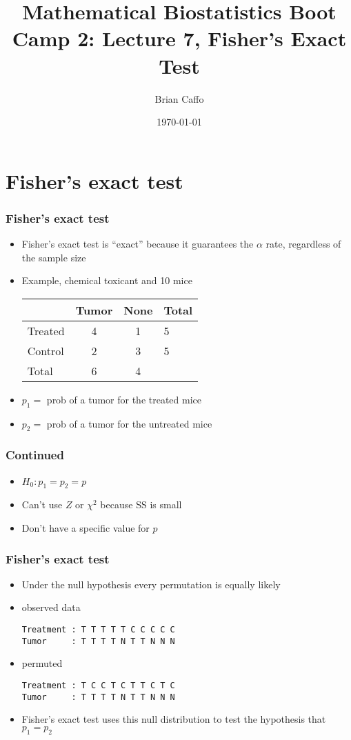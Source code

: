 \documentclass[aspectratio=169]{beamer}
\title{Mathematical Biostatistics Boot Camp 2: Lecture 7, Fisher's Exact Test}
\author{Brian Caffo}
\date{\today}
\institute[Department of Biostatistics]{
  Department of Biostatistics \\
  Johns Hopkins Bloomberg School of Public Health\\
  Johns Hopkins University
}
\begin{document}
\frame{\titlepage}


\section{Fisher's exact test}
\begin{frame}\frametitle{Fisher's exact test}
\begin{itemize}
\item Fisher's exact test is ``exact'' because it guarantees the $\alpha$ rate, 
  regardless of the sample size
\item Example, chemical toxicant and 10 mice
\begin{center}
  \begin{tabular}{lccl}
        & Tumor & None     & Total \\ \hline
Treated & 4     & 1        & 5 \\ 
Control & 2     & 3        & 5 \\ \hline
Total   & 6     & 4        &
  \end{tabular}
\end{center}
\item $p_1 = $ prob of a tumor for the treated mice
\item $p_2 = $ prob of a tumor for the untreated mice
\end{itemize}
\end{frame}

\begin{frame}\frametitle{Continued}
  \begin{itemize}
  \item $H_0:p_1 = p_2 = p$
  \item Can't use $Z$ or $\chi^2$ because SS is small
  \item Don't have a specific value for $p$
  \end{itemize}
\end{frame}

\begin{frame}[fragile]\frametitle{Fisher's exact test}
  \begin{itemize}
  \item Under the null hypothesis every permutation is equally likely
  \item observed data
\begin{verbatim}
Treatment : T T T T T C C C C C         
Tumor     : T T T T N T T N N N 
\end{verbatim}
  \item permuted
\begin{verbatim}
Treatment : T C C T C T T C T C         
Tumor     : T T T T N T T N N N 
\end{verbatim}
  \item Fisher's exact test uses this null distribution to test the
    hypothesis that $p_1 = p_2$
  \end{itemize}
\end{frame}
\end{document}
